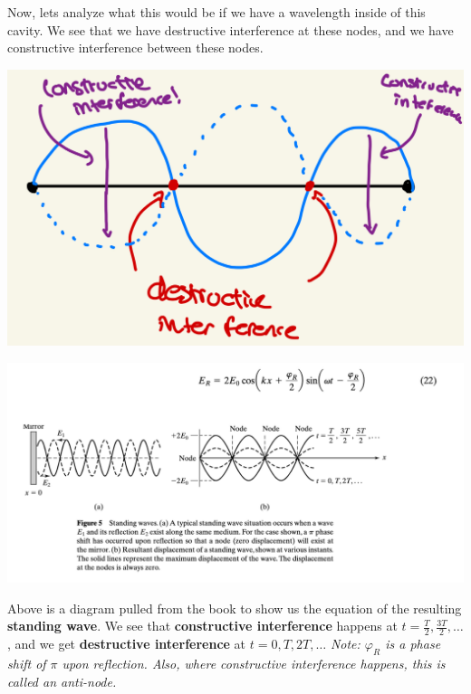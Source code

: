 \documentclass[10pt]{article}
\begin{document}
Now, lets analyze what this would be if we have a wavelength inside of this cavity. We see that we have destructive interference at these nodes, and we have constructive interference between these nodes.

\begin{center}
    \includegraphics*[scale = .15]{imgs/standing-wave-with-nodes.jpeg}
\end{center}

\newpage

\begin{center}
    \includegraphics*[scale = .75]{imgs/book-standing-wave-diagram.png}
\end{center}

Above is a diagram pulled from the book to show us the equation of the resulting \textbf{standing wave}. We see that \textbf{constructive interference} happens at $t = \frac{T}{2}, \frac{3T}{2}, \dots$, and we get \textbf{destructive interference} at $t = 0, T, 2T, \dots$ \textit{Note: $\varphi_R$ is a phase shift of $\pi$ upon reflection. Also, where constructive interference happens, this is called an anti-node.}

\newblock
\end{document}
